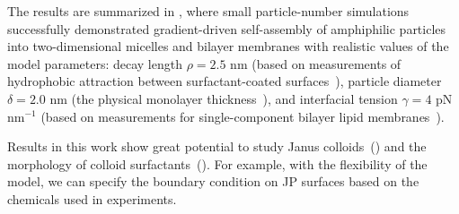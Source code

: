 The results are summarized in \cite{Fu2018_SIAM}, where
small particle-number simulations successfully demonstrated gradient-driven self-assembly of
amphiphilic particles into two-dimensional micelles and bilayer membranes with realistic values of
the model parameters: decay length $\rho=2.5$ nm (based on measurements of
hydrophobic attraction between surfactant-coated
surfaces~\cite{Eriksson1989, Lin2005, Parsegian, Israelachvili80}),
particle diameter $\delta = 2.0$ nm (the physical monolayer thickness~\cite{Boal}),
and interfacial tension $\gamma = 4$ pN nm$^{-1}$ (based on
measurements for single-component bilayer lipid
membranes~\cite{GarciaSaez, KUZMIN2005, Petelska2012, Jackson2016}).


Results in this work show great potential to study
Janus colloids~(\cite{Bradley2017,Mallory2017})
and the morphology of colloid
surfactants~(\cite{Bradley2016}). 
For example, with the flexibility of the model, we can specify the
boundary condition on JP surfaces based on the chemicals used in
experiments.

